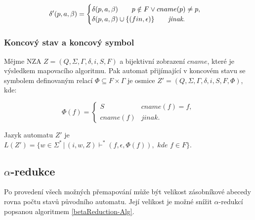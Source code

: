             \vspace{-0.5cm}
            $$
            \delta'(p, a, \beta) =
            \begin{cases}
                \delta(p, a, \beta) \hspace{0.7cm} p \notin F \lor cname(p) \neq p,\\
                \delta(p, a, \beta) \cup \{(fin, \epsilon)\} \hspace{0.7cm} \textit{jinak}.
            \end{cases}
            $$

        \subsubsection*{Koncový stav a koncový symbol}
            Mějme NZA $Z = (Q, \Sigma, \Gamma, \delta, i, S, F)$ a bijektivní zobrazení $cname$, které je výsledkem mapovacího algoritmu. Pak automat přijímající v koncovém stavu se symbolem definovaným relací $\Phi \subseteq F \times \Gamma$ je osmice $Z' = (Q, \Sigma, \Gamma, \delta, i, S, F, \Phi)$, kde:

            \vspace{-0.5cm}
            $$\Phi(f) =
            \begin{cases}
                S & cname(f) = f,\\
                cname(f) & jinak.
            \end{cases}
            $$

            Jazyk automatu $Z'$ je  $L(Z') = \{w \in \Sigma^*\,|\,(i, w, Z) \vdash^* (f, \epsilon, \Phi(f)),\textit{ kde } f \in F\}$.

    \subsection{$\alpha$-redukce}
        Po provedení všech možných přemapování může být velikost zásobníkové abecedy rovna počtu stavů původního automatu. Její velikost je možné snížit $\alpha$-redukcí popsanou algoritmem \ref{betaReduction-Alg}.

